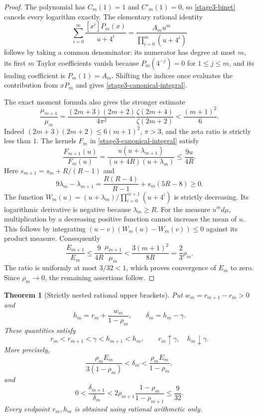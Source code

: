 \documentclass[11pt,a4paper]{article}
\newtheorem{theorem}{Theorem}[section]
\theoremstyle{definition}
\theoremstyle{remark}
\begin{document}
\begin{proof}
The polynomial has $C_m(1)=1$ and $C'_m(1)=0$, so
\eqref{stage3-binet} cancels every logarithm exactly. The elementary
rational identity
\[
 \sum_{i=0}^m\frac{[x^i]P_m(x)}{u+4^i}
 =\frac{A_mu^m}{\prod_{i=0}^m(u+4^i)}
\]
follows by taking a common denominator: its numerator has degree at
most $m$, its first $m$ Taylor coefficients vanish because
$P_m(4^{-j})=0$ for $1\le j\le m$, and its leading coefficient is
$P_m(1)=A_m$. Shifting the indices once evaluates the contribution
from $xP_m$ and gives \eqref{stage3-canonical-integral}.

The exact moment formula also gives the stronger estimate
\[
 \frac{\mu_{m+1}}{\mu_m}
 =\frac{(2m+3)(2m+2)}{4\pi^2}
       \frac{\zeta(2m+4)}{\zeta(2m+2)}
 <\frac{(m+1)^2}{6}.
\]
Indeed $(2m+3)(2m+2)\le6(m+1)^2$, $\pi>3$, and the zeta ratio is
strictly less than $1$. The kernels $F_m$ in
\eqref{stage3-canonical-integral} satisfy
\[
 \frac{F_{m+1}(u)}{F_m(u)}
 =\frac{u(u+\lambda_{m+1})}{(u+4R)(u+\lambda_m)}
 \le\frac{9u}{4R}.
\]
Here $s_{m+1}=s_m+R/(R-1)$ and
\[
 9\lambda_m-\lambda_{m+1}
 =\frac{R(R-4)}{R-1}+s_m(5R-8)\ge0.
\]
The function
$W_m(u)=(u+\lambda_m)/\prod_{i=0}^{m+1}(u+4^i)$
is strictly decreasing. Its logarithmic derivative is negative because
$\lambda_m\ge R$. For the measure $u^m d\mu$, multiplication by a
decreasing positive function cannot increase the mean of $u$.
This follows by integrating
$(u-v)(W_m(u)-W_m(v))\le0$ against its product measure.
Consequently
\[
 \frac{E_{m+1}}{E_m}
 \le\frac9{4R}\frac{\mu_{m+1}}{\mu_m}
 <\frac{3(m+1)^2}{8R}=\frac23\rho_m.
\]
The ratio is uniformly at most $3/32<1$, which proves convergence of
$E_m$ to zero. Since $\rho_m\to0$, the remaining assertions follow.
\end{proof}

\begin{theorem}[Strictly nested rational upper brackets]
\label{stage3-nested-brackets}
Put $w_m=r_{m+1}-r_m>0$ and
\[
 h_m=r_m+\frac{w_m}{1-\rho_m},\qquad
 \delta_m=h_m-\gamma.
\]
These quantities satisfy
\[
 r_m<r_{m+1}<\gamma<h_{m+1}<h_m,
 \qquad r_m\uparrow\gamma,\quad h_m\downarrow\gamma.
\]
More precisely,
\begin{equation}\label{stage3-upper-gap-sandwich}
 \frac{\rho_m E_m}{3(1-\rho_m)}<\delta_m
 <\frac{\rho_m E_m}{1-\rho_m},
\end{equation}
and
\[
 0<\frac{\delta_{m+1}}{\delta_m}
 <2\rho_{m+1}\frac{1-\rho_m}{1-\rho_{m+1}}
 \le\frac9{32}.
\]
Every endpoint $r_m,h_m$ is obtained using rational arithmetic only.
\end{theorem}
\end{document}
